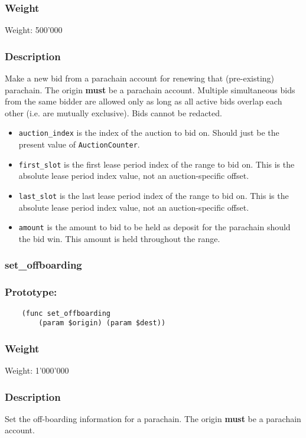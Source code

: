 \documentclass[11pt,a4paper]{article}
\begin{document}
\subsubsection*{Weight}
Weight: 500'000
\subsubsection*{Description}
Make a new bid from a parachain account for renewing that (pre-existing) parachain. The origin \textbf{must} be a parachain account. Multiple simultaneous bids from the same bidder are allowed only as long as all active bids overlap each other (i.e. are mutually exclusive). Bids cannot be redacted.

\begin{itemize}
\item \verb|auction_index| is the index of the auction to bid on. Should just be the present value of \verb|AuctionCounter|.
\item \verb|first_slot| is the first lease period index of the range to bid on. This is the absolute lease period index value, not an auction-specific offset.
\item \verb|last_slot| is the last lease period index of the range to bid on. This is the absolute lease period index value, not an auction-specific offset.
\item \verb|amount| is the amount to bid to be held as deposit for the parachain should the bid win. This amount is held throughout the range.
\end{itemize}

\subsubsection{set\_offboarding}
\subsubsection*{Prototype:}
\begin{verbatim}
    (func set_offboarding
        (param $origin) (param $dest))
\end{verbatim}
\subsubsection*{Weight}
Weight: 1'000'000
\subsubsection*{Description}
Set the off-boarding information for a parachain. The origin \textbf{must} be a parachain account.
\end{document}
